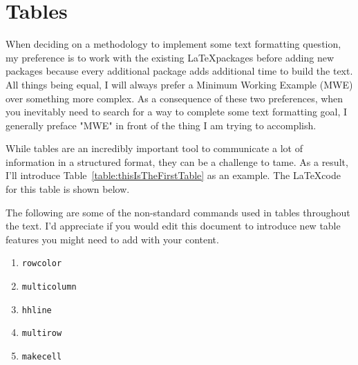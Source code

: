 \section{Tables}
\label{section:howToTables}
When deciding on a methodology to implement some text formatting question,
my preference is to work with the existing \LaTeX packages before adding new
packages because every additional package adds additional time to build the
text.  All things being equal, I will always prefer a Minimum Working Example 
(MWE) over something more complex.  As a consequence of these two preferences,
when you inevitably need to search for a way to complete some text formatting
goal, I generally preface "MWE" in front of the thing I am trying to accomplish.

While tables are an incredibly important tool to communicate a lot of information 
in a structured format, they can be a challenge to tame.  As a result, I'll introduce
Table~\ref{table:thisIsTheFirstTable} as an example.  The \LaTeX code for this table
is shown below.

The following are some of the non-standard commands used in tables throughout the text.  I'd appreciate if you would 
edit this document to introduce new table features you might need to add with your content.  
\begin{enumerate}
\item \verb+rowcolor+
\item \verb+multicolumn+
\item \verb+hhline+
\item \verb+multirow+
\item \verb+makecell+
\end{enumerate}

